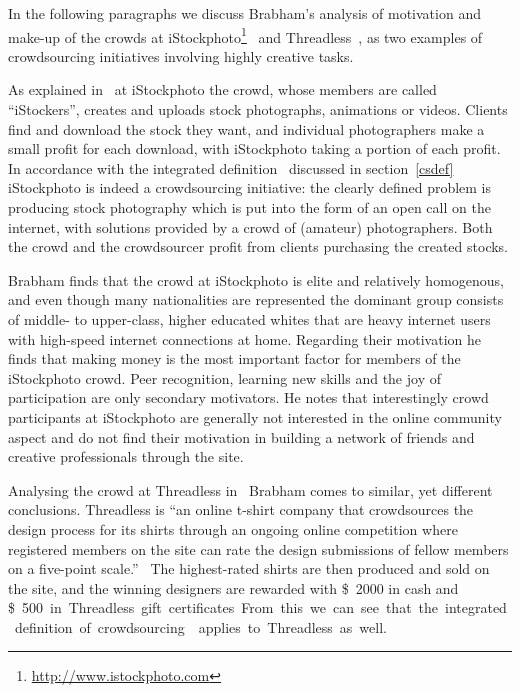 \documentclass{sig-alternate}
\begin{document}
In the following paragraphs we discuss Brabham's analysis of motivation and
make-up of the crowds at
iStockphoto\footnote{\url{http://www.istockphoto.com}}~\cite{brabham2008moving}
and Threadless~\cite{brabham2010moving}, as two examples of crowdsourcing
initiatives involving highly creative tasks. 

As explained in~\cite{brabham2008moving} at iStockphoto the crowd, whose
members are called ``iStockers'', creates and uploads stock photographs,
animations or videos.  Clients find and download the stock they want, and
individual photographers make a small profit for each download, with
iStockphoto taking a portion of each profit. In accordance with the integrated
definition~\cite{estelles2012towards} discussed in section~\ref{csdef}
iStockphoto is indeed a crowdsourcing initiative: the clearly defined problem is
producing stock photography which is put into the form of an open call on the
internet, with solutions provided by a crowd of (amateur) photographers. Both
the crowd and the crowdsourcer profit from clients purchasing the created
stocks.

Brabham finds that the crowd at iStockphoto is elite and relatively homogenous,
and even though many nationalities are represented the dominant group consists
of middle- to upper-class, higher educated whites that are heavy internet users
with high-speed internet connections at home. Regarding their motivation he
finds that making money is the most important factor for members of the
iStockphoto crowd. Peer recognition, learning new skills and the joy of
participation are only secondary motivators. He notes that interestingly crowd
participants at iStockphoto are generally not interested in the online
community aspect and do not find their motivation in building a network of
friends and creative professionals through the site.

Analysing the crowd at Threadless in~\cite{brabham2010moving} Brabham comes to
similar, yet different conclusions. Threadless is ``an online t-shirt company
that crowdsources the design process for its shirts through an ongoing online
competition where registered members on the site can rate the design
submissions of fellow members on a five-point scale.''~\cite{brabham2010moving}
The highest-rated shirts are then produced and sold on the site, and the
winning designers are rewarded with \SI{2000}[\$]{} in cash and \SI{500}[\$] in
Threadless gift certificates. From this we can see that the integrated
definition of crowdsourcing~\cite{estelles2012towards} applies to Threadless as
well.
\end{document}
